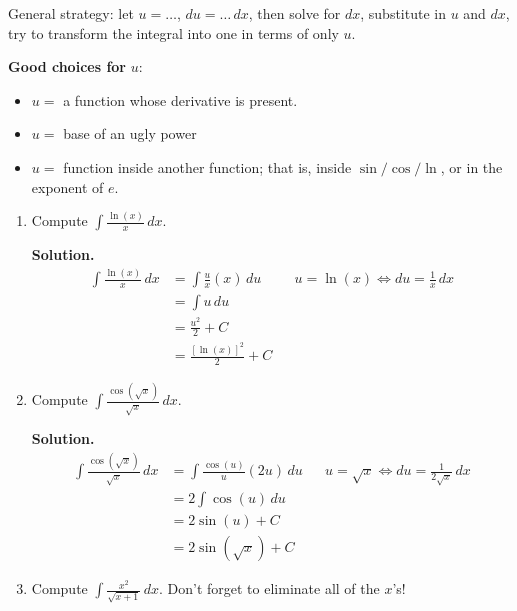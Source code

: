 General strategy: let $ u=\ldots $, $ du=\ldots\,dx $, then solve for
$ dx $, substitute in $ u $ and $ dx $, try to transform the integral into one
in terms of only $ u $.

\textbf{Good choices for} $ u $:
\begin{itemize}
    \item $ u= $ a function whose derivative is present.
    \item $ u= $ base of an ugly power
    \item $ u= $ function inside another function; that is, inside $ \sin/\cos/\ln $,
          or in the exponent of $ e $.
\end{itemize}

\begin{Example}{}{}
    \begin{enumerate}[label=(\roman*)]
        \item Compute $ \displaystyle  \int \frac{\ln(x)}{x} \, d{x} $.

              \textbf{Solution.}
              \begin{align*}
                  \int \frac{\ln(x)}{x} \, d{x}
                   & =\int \frac{u}{x} (x)\, d{u} &  & u=\ln(x)\iff du=\frac{1}{x}\, dx \\
                   & =\int u\, d{u}                                                     \\
                   & =\frac{u^2}{2} +C                                                  \\
                   & =\frac{[\ln(x)]^2}{2} +C
              \end{align*}
        \item Compute $ \displaystyle \int \frac{\cos(\sqrt{x})}{\sqrt{x}} \, d{x} $.

              \textbf{Solution.}
              \begin{align*}
                  \int \frac{\cos(\sqrt{x})}{\sqrt{x}} \, d{x}
                   & = \int \frac{\cos(u)}{u}(2u) \, d{u} &  & u=\sqrt{x}\iff du=\frac{1}{2\sqrt{x}}\, dx \\
                   & =2 \int \cos(u)\, d{u}                                                               \\
                   & =2\sin(u)+C                                                                          \\
                   & =2\sin(\sqrt{x})+C
              \end{align*}
        \item Compute
              $ \displaystyle \int \frac{x^2}{\sqrt{x+1}} \, d{x} $.
              Don't forget to eliminate all of the $ x $'s!


\end{enumerate}
\end{Example}
